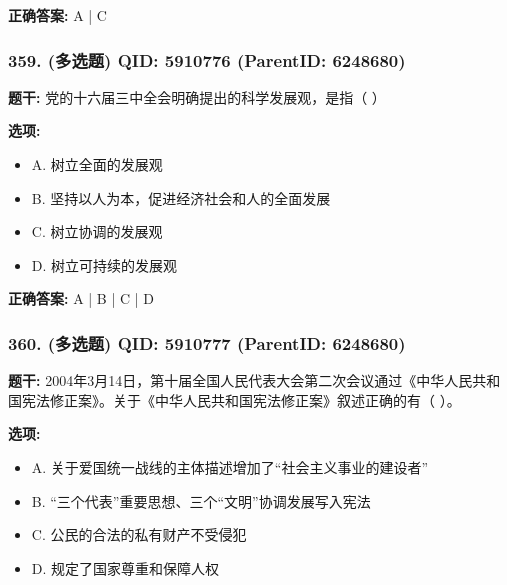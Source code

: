 \documentclass[12pt,UTF8]{ctexart}
\begin{document}
\textbf{正确答案:}
A | C

\vspace{0.3em}\hrulefill\vspace{0.7em}

\subsubsection*{359. (多选题) \small QID: 5910776 (ParentID: 6248680)}

\textbf{题干:}
党的十六届三中全会明确提出的科学发展观，是指（ ）



\textbf{选项:}
\begin{itemize}[leftmargin=*]

  \item A. 树立全面的发展观

  \item B. 坚持以人为本，促进经济社会和人的全面发展

  \item C. 树立协调的发展观

  \item D. 树立可持续的发展观

\end{itemize}

\textbf{正确答案:}
A | B | C | D

\vspace{0.3em}\hrulefill\vspace{0.7em}

\subsubsection*{360. (多选题) \small QID: 5910777 (ParentID: 6248680)}

\textbf{题干:}
2004年3月14日，第十届全国人民代表大会第二次会议通过《中华人民共和国宪法修正案》。关于《中华人民共和国宪法修正案》叙述正确的有（ ）。



\textbf{选项:}
\begin{itemize}[leftmargin=*]

  \item A. 关于爱国统一战线的主体描述增加了“社会主义事业的建设者”

  \item B. “三个代表”重要思想、三个“文明”协调发展写入宪法

  \item C. 公民的合法的私有财产不受侵犯

  \item D. 规定了国家尊重和保障人权

\end{itemize}
\end{document}

